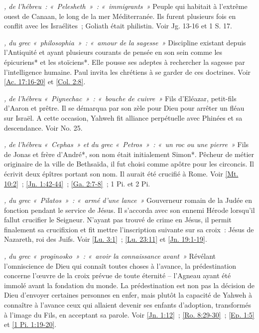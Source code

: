 \begin{multicols}{2}
\textit{, de l'hébreu~: «~Pelesheth~»~: «~immigrants~»}\newline
Peuple qui habitait à l'extrême ouest de Canaan, le long de la mer Méditerranée. Ils furent plusieurs fois en conflit avec les Israélites~; Goliath était philistin. Voir Jg. 13-16 et 1 S. 17.

\textit{, du grec «~philosophia~»~: «~amour de la sagesse~»}\newline
Discipline existant depuis l'Antiquité et ayant plusieurs courants de pensée en son sein comme les épicuriens* et les stoïciens*. Elle pousse ses adeptes à rechercher la sagesse par l'intelligence humaine. Paul invita les chrétiens à se garder de ces doctrines. Voir \vref{Ac. 17:16-20} et \vref{Col. 2:8}.

\textit{, de l'hébreu «~Piynechac~»~: «~bouche de cuivre~»}\newline
Fils d'Eléazar, petit-fils d'Aaron et prêtre. Il se démarqua par son zèle pour Dieu pour arrêter un fléau sur Israël. A cette occasion, Yahweh fit alliance perpétuelle avec Phinées et sa descendance. Voir No. 25.

\textit{, de l'hébreu «~Cephas~» et du grec «~Petros~»~: «~un roc ou une pierre~»}\newline
Fils de Jonas et frère d'André*, son nom était initialement Simon*. Pêcheur de métier originaire de la ville de Bethsaïda, il fut choisi comme apôtre pour les circoncis. Il écrivit deux épîtres portant son nom. Il aurait été crucifié à Rome. Voir \vref{Mt. 10:2}~; \vref{Jn. 1:42-44}~; \vref{Ga. 2:7-8}~; 1 Pi. et 2 Pi.

\textit{, du grec «~Pilatos~»~: «~armé d'une lance~»}\newline
Gouverneur romain de la Judée en fonction pendant le service de Jésus. Il s'accorda avec son ennemi Hérode lorsqu'il fallut crucifier le Seigneur. N'ayant pas trouvé de crime en Jésus, il permit finalement sa crucifixion et fit mettre l'inscription suivante sur sa croix~: Jésus de Nazareth, roi des Juifs. Voir \vref{Lu. 3:1}~; \vref{Lu. 23:11} et \vref{Jn. 19:1-19}.

\textit{, du grec «~proginosko~»~: «~avoir la connaissance avant~»}\newline
Révélant l'omniscience de Dieu qui connaît toutes choses à l'avance, la prédestination concerne l'œuvre de la croix prévue de toute éternité – l'Agneau ayant été immolé avant la fondation du monde. La prédestination est non pas la décision de Dieu d'envoyer certaines personnes en enfer, mais plutôt la capacité de Yahweh à connaître à l'avance ceux qui allaient devenir ses enfants d'adoption, transformés à l'image du Fils, en acceptant sa parole. Voir \vref{Jn. 1:12}~; \vref{Ro. 8:29-30}~; \vref{Ep. 1:5} et \vref{1 Pi. 1:19-20}.


\end{multicols}
